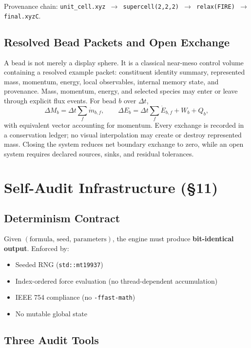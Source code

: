\documentclass[11pt, a4paper]{article}
\begin{document}
Provenance chain: \texttt{unit\_cell.xyz $\to$ supercell(2,2,2) $\to$ relax(FIRE) $\to$ final.xyzC}.

\subsection{Resolved Bead Packets and Open Exchange}

A bead is not merely a display sphere. It is a classical near-meso control volume containing a resolved example packet: constituent identity summary, represented mass, momentum, energy, local observables, internal memory state, and provenance. Mass, momentum, energy, and selected species may enter or leave through explicit flux events. For bead $b$ over $\Delta t$,
\begin{equation}
\Delta M_b = \Delta t\sum_f \dot{m}_{b,f}, \qquad
\Delta E_b = \Delta t\sum_f \dot{E}_{b,f} + W_b + Q_b,
\end{equation}
with equivalent vector accounting for momentum. Every exchange is recorded in a conservation ledger; no visual interpolation may create or destroy represented mass. Closing the system reduces net boundary exchange to zero, while an open system requires declared sources, sinks, and residual tolerances.


\section{Self-Audit Infrastructure (\S11)}

\subsection{Determinism Contract}

Given $(\text{formula},\, \text{seed},\, \text{parameters})$, the engine must produce \textbf{bit-identical output}.  Enforced by:
\begin{itemize}
\item Seeded RNG (\texttt{std::mt19937})
\item Index-ordered force evaluation (no thread-dependent accumulation)
\item IEEE 754 compliance (no \texttt{-ffast-math})
\item No mutable global state
\end{itemize}

\subsection{Three Audit Tools}
\end{document}
